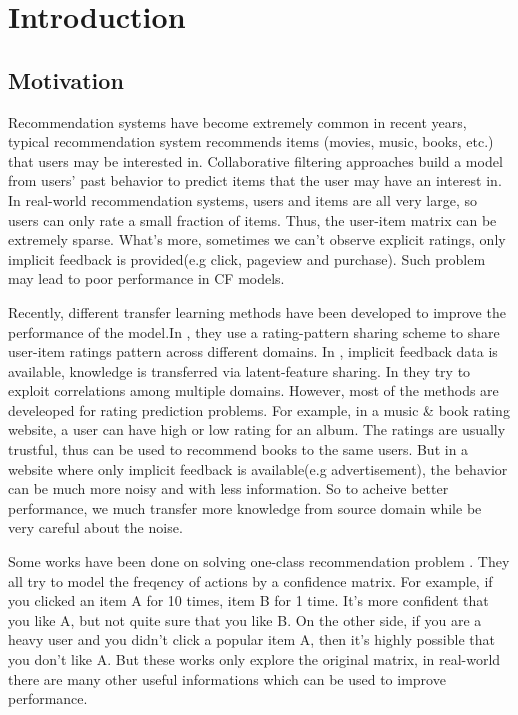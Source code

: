 \chapter{Introduction}
\label{chp:intro}

\hspace{0.1in}
\section{Motivation}
Recommendation systems have become extremely common in recent years, typical recommendation system recommends items (movies, music, books, etc.) that users may be interested in. Collaborative filtering approaches build a model from users' past behavior to predict items that the user may have an interest in. 
In real-world recommendation systems, users and items are all very large, so users can only rate a small fraction of items. Thus, the user-item matrix can be extremely sparse. What's more, sometimes we can't observe explicit ratings, only implicit feedback is provided(e.g click, pageview and purchase). Such problem may lead to poor performance in CF models.

Recently, different transfer learning methods have been developed to improve the performance of the model.In \cite{/ijcai/libin09, /icml/libin09}, they use a rating-pattern sharing scheme to share user-item ratings pattern across different domains. In \cite{/aaai/WPan12, Pan:2011:TLP:2283696.2283784}, implicit feedback data is available, knowledge is transferred via latent-feature sharing. In \cite{/uai/ZhangCY10, DBLP:conf/aaai/EldardiryN11} they try to exploit correlations among multiple domains.
However, most of the methods are develeoped for rating prediction problems. For example, in a music \& book rating website, a user can have high or low rating for an album. The ratings are usually trustful, thus can be used to recommend books to the same users. But in a website where only implicit feedback is available(e.g advertisement), the behavior can be much more noisy and with less information. So to acheive better performance, we much transfer more knowledge from source domain while be very careful about the noise.

Some works have been done on solving one-class recommendation problem \cite{4781121, 4781145}. They all try to model the freqency of actions by a confidence matrix. For example, if you clicked an item A for 10 times, item B for 1 time. It's more confident that you like A, but not quite sure that you like B. On the other side, if you are a heavy user and you didn't click a popular item A, then it's highly possible that you don't like A. But these works only explore the original matrix, in real-world there are many other useful informations which can be used to improve performance.

